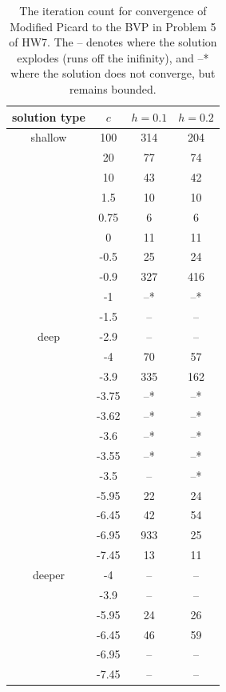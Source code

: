 \documentclass[11pt]{article}
\begin{document}
\begin{enumerate}
\begin{table}[h]
\begin{center}
\begin{tabular}{cccc}
  \hline
  solution type & $c$ & $h=0.1$ & $h=0.2$ \\
  \hline
  \hline
  shallow & 100 & 314 & 204 \\
          & 20 & 77 & 74 \\
          & 10 & 43 & 42 \\
          & 1.5 & 10 & 10 \\
          & 0.75 & 6 & 6 \\
          & 0 & 11 & 11 \\
          & -0.5 & 25 & 24 \\
          & -0.9 & 327 & 416 \\
          & -1 & --* & --* \\
          & -1.5 & -- & -- \\
  \hline
  deep    & -2.9 & -- & -- \\
          & -4 & 70 & 57 \\
          & -3.9 & 335 & 162 \\
          & -3.75 & --* & --* \\
          & -3.62 & --* & --* \\
          & -3.6 & --* & --* \\
          & -3.55 & --* & --* \\
          & -3.5 & -- & --* \\
          & -5.95 & 22 & 24 \\
          & -6.45 & 42 & 54 \\
          & -6.95 & 933 & 25 \\
          & -7.45 & 13 & 11 \\
  \hline
  deeper  & -4 & -- & -- \\
          & -3.9 & -- & -- \\
          & -5.95 & 24 & 26 \\
          & -6.45 & 46 & 59 \\
          & -6.95 & -- & -- \\
          & -7.45 & -- & -- \\
\end{tabular}
\caption{The iteration count for convergence of Modified Picard to the BVP in Problem 5 of HW7.
         The -- denotes where the solution explodes (runs off the inifinity), and --* where the solution does not converge, but remains bounded.}
\end{center}
\end{table}


\end{enumerate}
\end{document}
